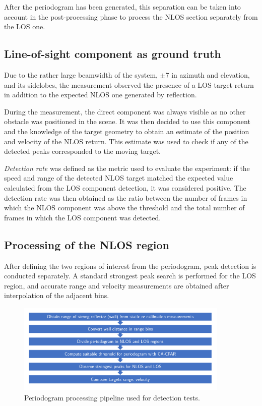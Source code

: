 After the periodogram has been generated, this separation can be taken into account in the post-processing phase to process the NLOS section separately from the LOS one.

\subsection{Line-of-sight component as ground truth}

Due to the rather large beamwidth of the system, $\pm$7\textdegree\hspace{1pt} in azimuth and elevation, and its sidelobes, the measurement observed the presence of a LOS target return in addition to the expected NLOS one generated by reflection.

During the measurement, the direct component was always visible as no other obstacle was positioned in the scene. It was then decided to use this component and the knowledge of the target geometry to obtain an estimate of the position and velocity of the NLOS return. This estimate was used to check if any of the detected peaks corresponded to the moving target.

\textit{Detection rate} was defined as the metric used to evaluate the experiment: if the speed and range of the detected NLOS target matched the expected value calculated from the LOS component detection, it was considered positive.
The detection rate was then obtained as the ratio between the number of frames in which the NLOS component was above the threshold and the total number of frames in which the LOS component was detected.

\subsection{Processing of the NLOS region}

After defining the two regions of interest from the periodogram, peak detection is conducted separately. A standard strongest peak search is performed for the LOS region, and accurate range and velocity measurements are obtained after interpolation of the adjacent bins.

\begin{figure}[H]
	\centering
	\includegraphics[width=0.9\textwidth]{Images/Test1/NLOS-proc-pipeline.png}
	\caption{Periodogram processing pipeline used for detection tests.}
	\label{fig:Test1_NLOS-proc-pipeline}
\end{figure}


